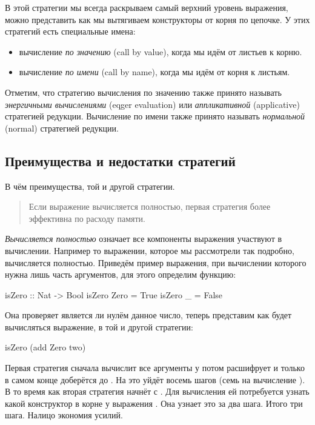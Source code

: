 В этой стратегии мы всегда раскрываем самый верхний уровень
выражения, можно представить как мы вытягиваем конструкторы
от корня по цепочке. У этих стратегий есть специальные имена:

\begin{itemize}
\item вычисление \emph{по значению} (call by value), когда 
    мы идём от листьев к корню.

\item вычисление \emph{по имени} (call by name), когда
    мы идём от корня к листьям.
\end{itemize}

Отметим, что стратегию вычисления по значению также принято
называть \emph{энергичными вычислениями} (eqger evaluation)
или \emph{аппликативной} (applicative) стратегией редукции. 
Вычисление по имени также принято называть
\emph{нормальной} (normal) стратегией редукции.

\subsection{Преимущества и недостатки стратегий}

В чём преимущества, той и другой стратегии. 

\begin{quote}
Если выражение вычисляется полностью, первая стратегия
более эффективна по расходу памяти.
\end{quote}

\emph{Вычисляется полностью} означает все компоненты
выражения участвуют в вычислении. Например то выражении,
которое мы рассмотрели так подробно, вычисляется полностью.
Приведём пример выражения, при вычислении которого нужна лишь
часть аргументов, для этого определим функцию: 

\begin{code}
isZero :: Nat -> Bool
isZero Zero     = True
isZero _        = False
\end{code}

Она проверяет является ли нулём данное число, теперь представим
как будет вычисляться выражение, в той и другой стратегии:

\begin{code}
isZero (add Zero two)
\end{code}

Первая стратегия сначала вычислит все аргументы у 
потом расшифрует  и только в самом конце доберётся 
до . На это уйдёт восемь шагов (семь 
на вычисление ).
В то время как вторая стратегия начнёт с . 
Для вычисления  ей потребуется узнать какой конструктор в корне у
выражения . Она узнает это за два шага. 
Итого три шага. Налицо экономия усилий. 

